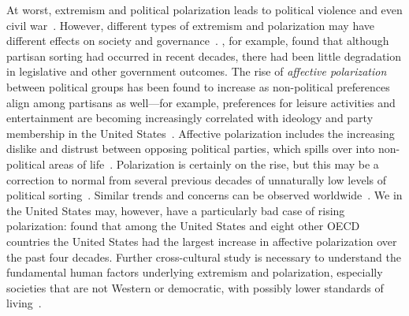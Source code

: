 At worst, extremism and political
polarization leads to political violence and even civil war~\cite{Epstein2013,Freeman2018}.
However, different types of extremism and polarization may have different
effects on society and governance~\cite{Lelkes2016}. , for example,
found that although partisan sorting had occurred in recent decades, there
had been little degradation in legislative and other government outcomes.
The rise of \emph{affective polarization} between political groups has been found to increase as non-political
preferences align among partisans as well---for example, preferences for
leisure activities and entertainment are becoming increasingly correlated
with ideology and party membership in the United States~\cite{Pew2014PublicPolarization,DellaPosta2015}.
Affective polarization includes the increasing dislike and distrust between opposing political parties, 
which spills over into non-political areas of life~\cite{Iyengar2019}. 
Polarization is certainly on the rise, but this may be a correction to normal from several previous decades of 
unnaturally low levels of political sorting~\cite{Lee2015,Wood2017b}.
Similar trends and concerns can be observed 
worldwide~\cite{Borge-Holthoefer2014,Morales2015,Romenskyy2017,Zmigrod2018}. 
We in the United States may, however, have a particularly bad case of rising polarization: 
 found that among the United States and eight other OECD countries
the United States had the largest increase in affective polarization over the
past four decades. Further cross-cultural study is necessary to understand the fundamental human factors underlying
extremism and polarization, especially societies that are not Western or democratic,
with possibly lower standards of living~\cite{Henrich2010}.

